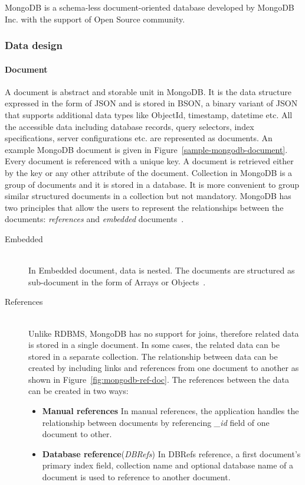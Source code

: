 MongoDB is a schema-less document-oriented database developed by MongoDB Inc. with the support of Open Source community. 
\subsubsection{Data design} 
\paragraph{Document}
	A document is abstract and storable unit in MongoDB. It is the data structure expressed in the form of JSON and is stored in BSON, a binary variant of JSON that supports additional data types like ObjectId, timestamp, datetime etc. All the accessible data including database records, query selectors, index specifications, server configurations etc. are represented as documents. An example  MongoDB document is given in Figure~\ref{sample-mongodb-document}.
Every document is referenced with a unique key. A document is retrieved either by the key or any other attribute of the document. Collection in MongoDB is a group of documents and it is stored in a database. It is more convenient to group similar structured documents in a collection but not mandatory. MongoDB has two principles that allow the users to represent the relationships between the documents: \textit{references} and \textit{embedded} documents~\citep{mongodb:org}. 
\begin{description}
\item[Embedded]\label{mongo:embedded} \hfill \\
    In Embedded document, data is nested. The documents are structured as sub-document in the form of Arrays or Objects~\citep{nosql/comparision}. 
    \item[References] \hfill \\
    Unlike RDBMS, MongoDB has no support for joins, therefore related data is stored in a single document. In some cases, the related data can be stored in a separate collection. The relationship between data can be created by including links and references from one document to another as shown in Figure~\ref{fig:mongodb-ref-doc}.  The references between the data can be created in two ways:
\begin{itemize}
	\item {\textbf{Manual references}}
		In manual references, the application handles the relationship between documents by referencing \textit{\_id} field of one document to other. 
	\item \textbf{Database reference}(\textit{DBRefs})
	In  DBRefs reference, a first document's primary index field, collection name and optional database name of a document is used to reference to another document.
\end{itemize}



\end{description}

